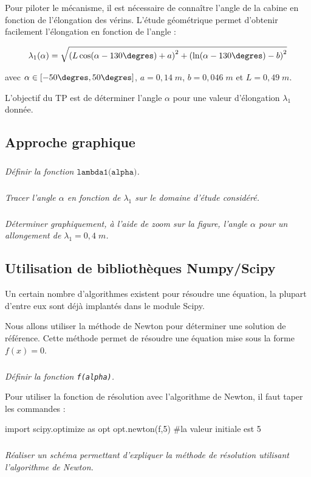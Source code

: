 \documentclass[10pt]{article}
\begin{document}
Pour piloter le mécanisme, il est nécessaire de connaître l'angle de la cabine en fonction de l'élongation des vérins. L'étude géométrique permet d'obtenir facilement l'élongation en fonction de l'angle :

$$\lambda_1(\alpha) = \sqrt{\left(L\cos(\alpha-130\degres)  +a\right)^2+\left(\ln(\alpha-{130}{\degres})-b\right)^2} $$ 

avec $\alpha\in[{-50}{\degres}, {50}{\degres}]$, $a = {0,14}{\; m}$, $b = {0,046}{\; m}$ et $L = {0,49}{\; m}$.

L'objectif du TP est de déterminer l'angle $\alpha$ pour une valeur d'élongation $\lambda_1$ donnée.

\subsection{Approche graphique}

\subparagraph{}\textit{Définir la fonction $\texttt{lambda1(alpha)}$.}

\subparagraph{}\textit{Tracer l'angle $\alpha$ en fonction de $\lambda_1$ sur le domaine d'étude considéré.}

\subparagraph{}\textit{Déterminer graphiquement, à l'aide de zoom sur la figure, l'angle $\alpha$ pour un allongement de $\lambda_1={0,4}{\; m}$.}

\subsection{Utilisation de bibliothèques Numpy/Scipy}
Un certain nombre d'algorithmes existent pour résoudre une équation, la plupart d'entre eux sont déjà implantés dans le module Scipy.

Nous allons utiliser la méthode de Newton pour déterminer une solution de référence. Cette méthode permet de résoudre une équation mise sous la forme $f(x) = 0$.

\subparagraph{}\textit{Définir la fonction \texttt{f(alpha)}.}

Pour utiliser la fonction de résolution avec l'algorithme de Newton, il faut taper les commandes :
\begin{py}
\begin{python}
import scipy.optimize as opt
opt.newton(f,5)  #la valeur initiale est 5
\end{python}
\end{py}

\subparagraph{}
\textit{Réaliser un schéma permettant d'expliquer la méthode de résolution utilisant l'algorithme de Newton.}
\end{document}
